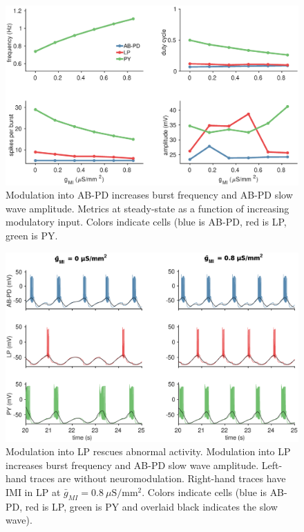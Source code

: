 \begin{figure}[h]
	\centering
	\includegraphics[width=1.0\linewidth]{gfx/network/network_AB_47_metrics}
	\caption[Network with modulation into AB-PD (metrics)]{Modulation into \acs{AB}-\acs{PD} increases burst frequency and \acs{AB}-\acs{PD} slow wave amplitude. Metrics at steady-state as a function of increasing modulatory input. Colors indicate cells (blue is \acs{AB}-\acs{PD}, red is \acs{LP}, green is \acs{PY}.}
	\label{fig:networkab47metrics}
\end{figure}

\FloatBarrier

\begin{figure}[h]
	\centering
	\includegraphics[width=1.0\linewidth]{gfx/network/network_LP_28_traces}
	\caption[Network with modulation into LP (traces)]{Modulation into \acs{LP} rescues abnormal activity. Modulation into \acs{LP} increases burst frequency and \acs{AB}-\acs{PD} slow wave amplitude. Left-hand traces are without neuromodulation. Right-hand traces have \acs{IMI} in \acs{LP} at $\bar{g}_{MI} = 0.8~\mu \mathrm{S/mm^2}$. Colors indicate cells (blue is \acs{AB}-\acs{PD}, red is \acs{LP}, green is \acs{PY} and overlaid black indicates the slow wave).}
	\label{fig:networklp28traces}
\end{figure}

